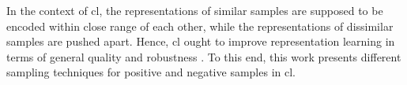 In the context of \acf{cl}, 
the representations of similar samples are supposed to be encoded 
within close range of each other, 
while the representations of dissimilar samples are pushed apart.
Hence, \ac{cl} ought to improve representation learning in terms of 
general quality and robustness \citet{mochi_2020}.
To this end, this work presents different sampling techniques for 
positive and negative samples in \ac{cl}.